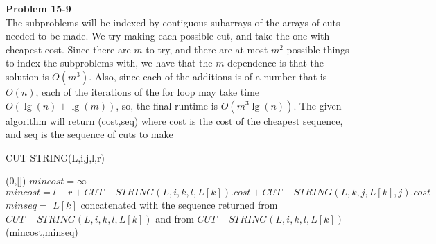 \documentclass{article}
\begin{document}
\noindent\textbf{Problem 15-9}\\

The subproblems will be indexed by contiguous subarrays of the arrays of cuts needed to be made. We try making each possible cut, and take the one with cheapest cost. Since there are $m$ to try, and there are at most $m^2$ possible things to index the subproblems with, we have that the $m$ dependence is that the solution is $O(m^3)$. Also, since each of the additions is of a number that is $O(n)$, each of the iterations of the for loop may take time $O(\lg(n)+\lg(m))$, so, the final runtime is $O(m^3\lg(n))$. The given algorithm will return (cost,seq) where cost is the cost of the cheapest sequence, and seq is the sequence of cuts to make
\begin{algorithm}
\caption{CUT-STRING(L,i,j,l,r)}
\begin{algorithmic}
\State \Return (0,[])
\EndIf
\State $mincost =\infty$
\State $mincost = l+r + CUT-STRING(L,i,k,l,L[k]).cost + CUT-STRING(L,k,j,L[k],j).cost$
\State $minseq =$ $L[k]$ concatenated with the sequence returned from$ CUT-STRING(L,i,k,l,L[k])$ and from $CUT-STRING(L,i,k,l,L[k])$
\EndIf
\EndFor
\State \Return (mincost,minseq)
\end{algorithmic}
\end{algorithm}
\end{document}
